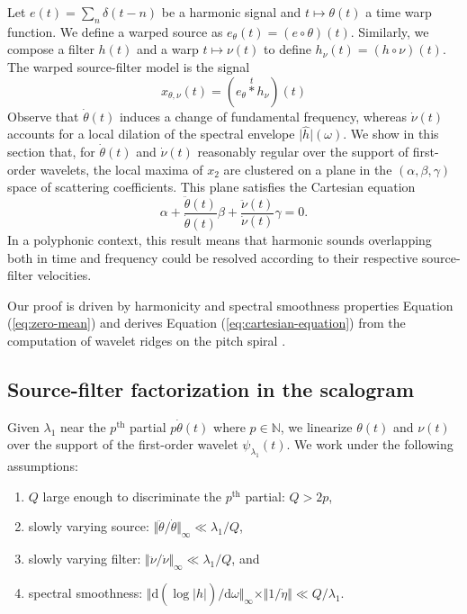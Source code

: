 \documentclass[twoside,a4paper]{article}
\begin{document}
Let $e(t)=\sum_{n}\delta(t - n)$ be a harmonic signal and
$t\mapsto\theta(t)$ a time warp function. We define a warped source
as $e_{\theta}(t)=(e\circ\theta)(t)$. Similarly, we compose a
filter $h(t)$ and a warp $t\mapsto\nu(t)$ to define $h_{\nu}(t)=(h\circ\nu)(t)$.
The warped source-filter model is the signal
\begin{equation}
x_{\theta, \nu}(t) =
(e_{\theta} \overset{t}{\ast} h_{\nu})(t)
\label{eq:source-filter}
\end{equation}
Observe that $\dot{\theta}(t)$ induces a change of fundamental frequency, where\-as
$\dot{\nu}(t)$ accounts for a local dilation of the spectral
envelope $\vert\widehat{h}\vert(\omega)$.
We show in this section that, for $\dot{\theta}(t)$ and $\dot{\nu}(t)$ reasonably regular over the support of first-order wavelets,
the local maxima of $x_{2}$ are clustered on a plane in the $(\alpha,\beta,\gamma)$ space of scattering coefficients.
This plane satisfies the Cartesian equation
\begin{equation}
\alpha +
\dfrac{\ddot{\theta}(t)}{\dot{\theta}(t)}\beta +
\dfrac{\ddot{\nu}(t)}{\dot{\nu}(t)}\gamma = 0.
\label{eq:cartesian-equation}
\end{equation}
In a polyphonic context, this result means that harmonic sounds overlapping both in time and frequency could be resolved according to their respective source-filter velocities.

Our proof is driven by harmonicity and spectral smoothness properties \textemdash{} Equation (\ref{eq:zero-mean}) \textemdash{} and derives Equation (\ref{eq:cartesian-equation}) from the computation of wavelet ridges on the pitch spiral \cite{Delprat1992}.



\subsection{Source-filter factorization in the scalogram}
Given $\lambda_1$ near the $p^{\textrm{th}}$ partial $p \dot{\theta}(t)$ where $p \in \mathbb{N}$, we linearize $\theta(t)$ and $\nu(t)$ over the support of the first-order wavelet $\psi_{\lambda_1}(t)$. We work under the following assumptions:

\renewcommand{\labelenumi}{(\alph{enumi})}
\begin{enumerate}
\item $Q$ large enough to discriminate the $p^\text{th}$ partial: $Q>2p$,
\item slowly varying source: $\Vert\ddot{\theta}/\dot{\theta}\Vert_{\infty} \ll \lambda_{1}/Q$,
\item slowly varying filter: $\Vert\ddot{\nu}/\dot{\nu}\Vert_{\infty}\ll\lambda_{1}/Q$, and
\item spectral smoothness: $\Vert\mathrm{d}( \log \vert \hat{h} \vert ) / \mathrm{d} \omega \Vert_{\infty} \times \Vert 1 / \dot{\eta} \Vert \ll Q / \lambda_{1}$.
\end{enumerate}
\end{document}
